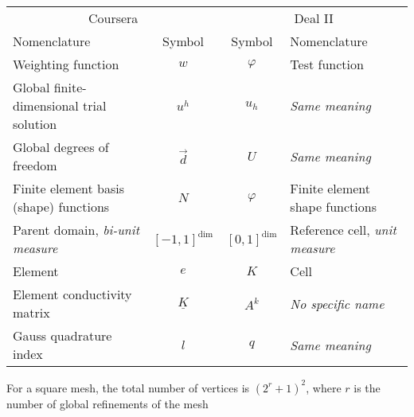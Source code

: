 \documentclass[a4paper]{article}
\begin{document}
\begin{tabular}{@{} l c c l @{}} \toprule
    \multicolumn{2}{c}{Coursera} & \multicolumn{2}{c}{Deal II} \\
    \cmidrule(r){1-2} \cmidrule(l){3-4}
    Nomenclature & Symbol & Symbol & Nomenclature \\
    \midrule
    Weighting function & $w$ & $\varphi$ & Test function \\
    Global finite-dimensional trial solution  & $u^h$ & $u_h$ & \emph{Same meaning} \\
    Global degrees of freedom & $\vec{d}$ & $U$ & \emph{Same meaning} \\
    Finite element basis (shape) functions & $N$ & $\varphi$ & Finite element shape functions  \\
    Parent domain, \emph{bi-unit measure} & $[-1,1]^\text{dim}$ & $[0,1]^\text{dim}$ & Reference cell, \emph{unit measure}  \\
    Element & $e$ & $K$ & Cell  \\
    Element conductivity matrix & $\underline{K}$ & $A^k$ & \emph{No specific name}   \\
    Gauss quadrature index & $l$ & $q$ & \emph{Same meaning}   \\
    \bottomrule
\end{tabular}

\bigskip
For a square mesh, the total number of vertices is $(2^r + 1)^2$, where $r$ is the number of global refinements of the mesh
\end{document}
